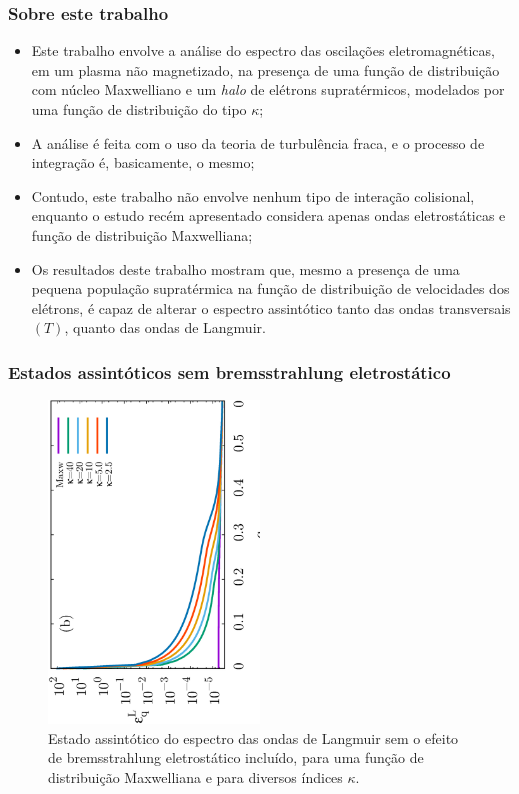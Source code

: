\documentclass[10pt,aspectratio=1610,lualatex]{beamer}
\begin{document}
\begin{frame}
  \frametitle{Sobre este trabalho}
  \begin{itemize}
    \item Este trabalho envolve a análise do espectro das oscilações
    eletromagnéticas, em um plasma não magnetizado, na presença de uma
    função de distribuição com núcleo Maxwelliano e um \emph{halo} de
    elétrons supratérmicos, modelados por uma função de distribuição
    do tipo $\kappa$;
    \vspace{0.2cm}
    \pause
    \item A análise é feita com o uso da teoria de turbulência fraca,
    e o processo de integração é, basicamente, o mesmo;
    \vspace{0.2cm}
    \pause
    \item Contudo, este trabalho não envolve nenhum tipo de interação
    colisional, enquanto o estudo recém apresentado considera apenas
    ondas eletrostáticas e função de distribuição Maxwelliana;
    \vspace{0.2cm}
    \pause
    \item Os resultados deste trabalho mostram que, mesmo a presença de
    uma pequena população supratérmica na função de distribuição de
    velocidades dos elétrons, é capaz de alterar o espectro assintótico
    tanto das ondas transversais  $(T)$, quanto das ondas de Langmuir.
  \end{itemize}
\end{frame}

\begin{frame}
  \frametitle{Estados assintóticos sem bremsstrahlung
    eletrostático}
  \begin{figure}
    \centering\includegraphics[width=0.5\textwidth,angle=270]{IL1D_005kvarno-brem}
    \caption*{Estado assintótico do espectro das ondas de Langmuir sem o
      efeito de bremsstrahlung eletrostático incluído, para uma função de
      distribuição Maxwelliana e para diversos índices $\kappa$.}
  \end{figure}
\end{frame}
\end{document}
